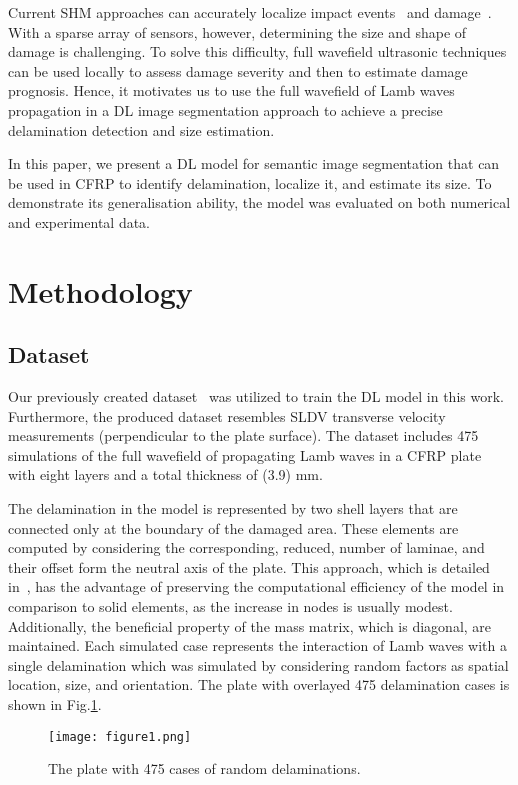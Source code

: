 \documentclass[runningheads]{llncs}
\begin{document}
Current SHM approaches can accurately localize impact events~\cite{Ciampa2012} and damage~\cite{Nokhbatolfoghahai2020}.
With a sparse array of sensors, however, determining the size and shape of damage is challenging.
To solve this difficulty, full wavefield ultrasonic techniques can be used locally to assess damage severity and then to estimate damage prognosis.
Hence, it motivates us to use the full wavefield of Lamb waves propagation in a DL image segmentation approach to achieve a precise delamination detection and size estimation.

In this paper, we present a DL model for semantic image segmentation that can be used in CFRP to identify delamination, localize it, and estimate its size.
To demonstrate its generalisation ability, the model was evaluated on both numerical and experimental data.
\section{Methodology}
\label{methodology}
\subsection{Dataset}
Our previously created dataset~\cite{Ijjeh2021} was utilized to train the DL model in this work.
Furthermore, the produced dataset resembles SLDV transverse velocity measurements (perpendicular to the plate surface).
The dataset includes 475 simulations of the full wavefield of propagating Lamb waves in a CFRP plate with eight layers and a total thickness of (3.9) mm.


The delamination in the model is represented by two shell layers that are connected only at the boundary of the damaged area. 
These elements are computed by considering the corresponding, reduced, number of laminae, and their offset form the neutral axis of the plate. 
This approach, which is detailed in~\cite{Kudela2009}, has the advantage of preserving the computational efficiency of the model in comparison to solid elements, as the increase in nodes is usually modest. 
Additionally, the beneficial property of the mass matrix, which is diagonal, are maintained. 
Each simulated case represents the interaction of Lamb waves with a single   delamination which was simulated by considering random factors as spatial location, size, and orientation.
The plate with overlayed 475 delamination cases is shown in Fig.\ref{fig:rand_delaminations}. 
\begin{figure} [h!]
	\begin{center}
		\texttt{[image: figure1.png]}
	\end{center}
	\caption{The plate with 475 cases of random delaminations.} 
	\label{fig:rand_delaminations}
\end{figure}
\end{document}
